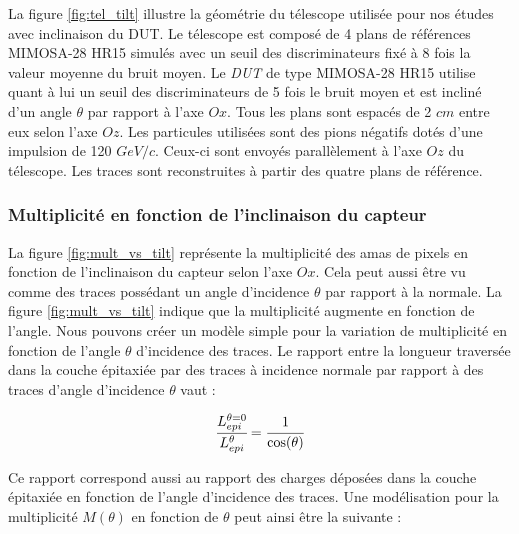    La figure \ref{fig:tel_tilt} illustre la g\'eom\'etrie du t\'elescope utilis\'ee pour nos \'etudes avec inclinaison du DUT. Le t\'elescope est compos\'e de 4 plans de r\'ef\'erences MIMOSA-28 HR15 simul\'es avec un seuil des discriminateurs fix\'e \`a 8 fois la valeur moyenne du bruit moyen. Le \textit{DUT} de type MIMOSA-28 HR15 utilise quant \`a lui un seuil des discriminateurs de 5 fois le bruit moyen et est inclin\'e d'un angle $\theta$ par rapport à l'axe $Ox$. Tous les plans sont espac\'es de 2 $cm$ entre eux selon l'axe $Oz$. Les particules utilis\'ees sont des pions n\'egatifs dot\'es d'une impulsion de 120 $GeV/c$. Ceux-ci sont envoy\'es parall\`element \`a l'axe $Oz$ du t\'elescope. Les traces sont reconstruites \`a partir des quatre plans de r\'ef\'erence.
   
   \subsubsection{Multiplicit\'e en fonction de l'inclinaison du capteur}
   
   La figure \ref{fig:mult_vs_tilt} repr\'esente la multiplicit\'e des amas de pixels en fonction de l'inclinaison du capteur selon l'axe $Ox$. Cela peut aussi \^etre vu comme des traces poss\'edant un angle d'incidence $\theta$ par rapport \`a la normale. La figure \ref{fig:mult_vs_tilt} indique que la multiplicit\'e augmente en fonction de l'angle. Nous pouvons cr\'eer un mod\`ele simple pour la variation de multiplicit\'e en fonction de l'angle $\theta$ d'incidence des traces. Le rapport entre la longueur travers\'ee dans la couche \'epitaxi\'ee par des traces \`a incidence normale par rapport \`a des traces d'angle d'incidence $\theta$ vaut :
   
   \begin{equation}
    \cfrac{L_{epi}^{\theta=0}}{L_{epi}^{\theta}} = \cfrac{1}{\cos(\theta)}
   \end{equation}
   
   Ce rapport correspond aussi au rapport des charges d\'epos\'ees dans la couche \'epitaxi\'ee en fonction de l'angle d'incidence des traces. Une modélisation pour la multiplicit\'e $M(\theta)$ en fonction de $\theta$ peut ainsi \^etre la suivante :
   
   
